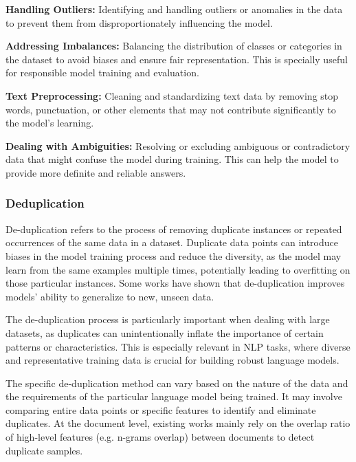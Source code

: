 \documentclass[conference]{IEEEtran}
\begin{document}
\textbf{Handling Outliers:} Identifying and handling outliers or anomalies in the data to prevent them from disproportionately influencing the model.

\textbf{Addressing Imbalances:} Balancing the distribution of classes or categories in the dataset to avoid biases and ensure fair representation. This is specially useful for responsible model training and evaluation.

\textbf{Text Preprocessing:} Cleaning and standardizing text data by removing stop words, punctuation, or other elements that may not contribute significantly to the model's learning.

\textbf{Dealing with Ambiguities:} Resolving or excluding ambiguous or contradictory data that might confuse the model during training. This can help the model to provide more definite and reliable answers.


\subsubsection{Deduplication}
De-duplication refers to the process of removing duplicate instances or repeated occurrences of the same data in a dataset. 
Duplicate data points can introduce biases in the model training process and reduce the diversity, as the model may learn from the same examples multiple times, potentially leading to overfitting on those particular instances.
Some works \cite{hernandez2022scaling} have shown that de-duplication improves models' ability to generalize to new, unseen data.

The de-duplication process is particularly important when dealing with large datasets, as duplicates can unintentionally inflate the importance of certain patterns or characteristics. This is especially relevant in NLP tasks, where diverse and representative training data is crucial for building robust language models.

The specific de-duplication method can vary based on the nature of the data and the requirements of the particular language model being trained. It may involve comparing entire data points or specific features to identify and eliminate duplicates.
At the document level, existing works mainly rely on the overlap ratio of high-level features (e.g. n-grams overlap) between documents to detect duplicate samples.
\end{document}
